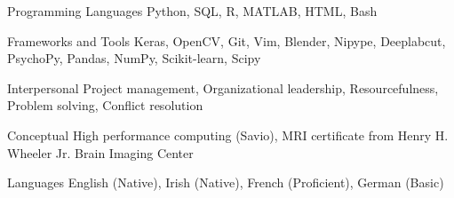 

\begin{cvskills}

 \cvskill
  	{Programming Languages}
    {Python, SQL, R, MATLAB, HTML, Bash} %
  
 \cvskill
   {Frameworks and Tools}
   {Keras, OpenCV, Git, Vim, Blender, Nipype, Deeplabcut, PsychoPy, Pandas, NumPy, Scikit-learn, Scipy}
  
 \cvskill
   {Interpersonal}
   {Project management, Organizational leadership, Resourcefulness, Problem solving, Conflict resolution}
   
 \cvskill
   {Conceptual}
   {High performance computing (Savio), MRI certificate from Henry H. Wheeler Jr. Brain Imaging Center}
   
  \cvskill
   {Languages}
   {English (Native), Irish (Native), French (Proficient), German (Basic)}
    

\end{cvskills}
